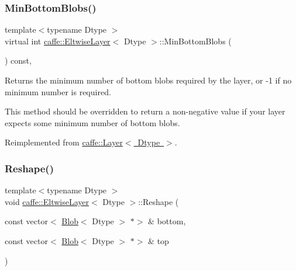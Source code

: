 \mbox{\label{classcaffe_1_1_eltwise_layer_a802079d89e0f007c15b39e0c1fb0d275}} 
\subsubsection{\texorpdfstring{Min\+Bottom\+Blobs()}{MinBottomBlobs()}\hspace{0.1cm}{\footnotesize\ttfamily [2/2]}}
{\footnotesize\ttfamily template$<$typename Dtype $>$ \\
virtual int \mbox{\hyperlink{classcaffe_1_1_eltwise_layer}{caffe\+::\+Eltwise\+Layer}}$<$ Dtype $>$\+::Min\+Bottom\+Blobs (\begin{DoxyParamCaption}{ }\end{DoxyParamCaption}) const\hspace{0.3cm}{\ttfamily [inline]}, {\ttfamily [virtual]}}



Returns the minimum number of bottom blobs required by the layer, or -\/1 if no minimum number is required. 

This method should be overridden to return a non-\/negative value if your layer expects some minimum number of bottom blobs. 

Reimplemented from \mbox{\hyperlink{classcaffe_1_1_layer_aca3cb2bafaefda5d4760aaebd0b72def}{caffe\+::\+Layer$<$ Dtype $>$}}.

\mbox{\label{classcaffe_1_1_eltwise_layer_a17b4cb0842a154224bab9733e77e07b9}} 
\subsubsection{\texorpdfstring{Reshape()}{Reshape()}\hspace{0.1cm}{\footnotesize\ttfamily [1/2]}}
{\footnotesize\ttfamily template$<$typename Dtype $>$ \\
void \mbox{\hyperlink{classcaffe_1_1_eltwise_layer}{caffe\+::\+Eltwise\+Layer}}$<$ Dtype $>$\+::Reshape (\begin{DoxyParamCaption}\item[{const vector$<$ \mbox{\hyperlink{classcaffe_1_1_blob}{Blob}}$<$ Dtype $>$ $\ast$$>$ \&}]{bottom,  }\item[{const vector$<$ \mbox{\hyperlink{classcaffe_1_1_blob}{Blob}}$<$ Dtype $>$ $\ast$$>$ \&}]{top }\end{DoxyParamCaption})\hspace{0.3cm}{\ttfamily [virtual]}}



